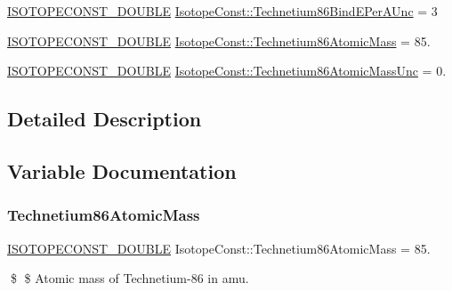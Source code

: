 \begin{DoxyCompactItemize}
\mbox{\hyperlink{group___isotope_const-_macros_ga8f45a7272ce02c0b4c65c44636ed719a}{I\+S\+O\+T\+O\+P\+E\+C\+O\+N\+S\+T\+\_\+\+D\+O\+U\+B\+LE}} \mbox{\hyperlink{group___isotope_const-_technetium-_tc86_ga0ad915f0296bb69e552ef378309a5b75}{Isotope\+Const\+::\+Technetium86\+Bind\+E\+Per\+A\+Unc}} = 3
\item 
\mbox{\hyperlink{group___isotope_const-_macros_ga8f45a7272ce02c0b4c65c44636ed719a}{I\+S\+O\+T\+O\+P\+E\+C\+O\+N\+S\+T\+\_\+\+D\+O\+U\+B\+LE}} \mbox{\hyperlink{group___isotope_const-_technetium-_tc86_gac40184eed9b331136796d8b7a7ac721a}{Isotope\+Const\+::\+Technetium86\+Atomic\+Mass}} = 85.
\item 
\mbox{\hyperlink{group___isotope_const-_macros_ga8f45a7272ce02c0b4c65c44636ed719a}{I\+S\+O\+T\+O\+P\+E\+C\+O\+N\+S\+T\+\_\+\+D\+O\+U\+B\+LE}} \mbox{\hyperlink{group___isotope_const-_technetium-_tc86_ga65341f7c66d9323ba05482cc0e20daa5}{Isotope\+Const\+::\+Technetium86\+Atomic\+Mass\+Unc}} = 0.
\end{DoxyCompactItemize}


\subsection{Detailed Description}


\subsection{Variable Documentation}
\mbox{\label{group___isotope_const-_technetium-_tc86_gac40184eed9b331136796d8b7a7ac721a}} 
\subsubsection{\texorpdfstring{Technetium86\+Atomic\+Mass}{Technetium86AtomicMass}}
{\footnotesize\ttfamily \mbox{\hyperlink{group___isotope_const-_macros_ga8f45a7272ce02c0b4c65c44636ed719a}{I\+S\+O\+T\+O\+P\+E\+C\+O\+N\+S\+T\+\_\+\+D\+O\+U\+B\+LE}} Isotope\+Const\+::\+Technetium86\+Atomic\+Mass = 85.}

\$ \$ Atomic mass of Technetium-\/86 in amu. \mbox{\label{group___isotope_const-_technetium-_tc86_ga65341f7c66d9323ba05482cc0e20daa5}} 
